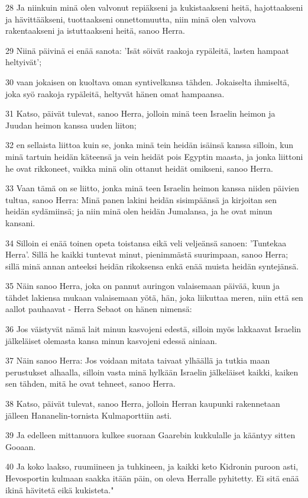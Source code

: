 \par 28 Ja niinkuin minä olen valvonut repiäkseni ja kukistaakseni heitä, hajottaakseni ja hävittääkseni, tuottaakseni onnettomuutta, niin minä olen valvova rakentaakseni ja istuttaakseni heitä, sanoo Herra.
\par 29 Niinä päivinä ei enää sanota: 'Isät söivät raakoja rypäleitä, lasten hampaat heltyivät';
\par 30 vaan jokaisen on kuoltava oman syntivelkansa tähden. Jokaiselta ihmiseltä, joka syö raakoja rypäleitä, heltyvät hänen omat hampaansa.
\par 31 Katso, päivät tulevat, sanoo Herra, jolloin minä teen Israelin heimon ja Juudan heimon kanssa uuden liiton;
\par 32 en sellaista liittoa kuin se, jonka minä tein heidän isäinsä kanssa silloin, kun minä tartuin heidän käteensä ja vein heidät pois Egyptin maasta, ja jonka liittoni he ovat rikkoneet, vaikka minä olin ottanut heidät omikseni, sanoo Herra.
\par 33 Vaan tämä on se liitto, jonka minä teen Israelin heimon kanssa niiden päivien tultua, sanoo Herra: Minä panen lakini heidän sisimpäänsä ja kirjoitan sen heidän sydämiinsä; ja niin minä olen heidän Jumalansa, ja he ovat minun kansani.
\par 34 Silloin ei enää toinen opeta toistansa eikä veli veljeänsä sanoen: 'Tuntekaa Herra'. Sillä he kaikki tuntevat minut, pienimmästä suurimpaan, sanoo Herra; sillä minä annan anteeksi heidän rikoksensa enkä enää muista heidän syntejänsä.
\par 35 Näin sanoo Herra, joka on pannut auringon valaisemaan päivää, kuun ja tähdet lakiensa mukaan valaisemaan yötä, hän, joka liikuttaa meren, niin että sen aallot pauhaavat - Herra Sebaot on hänen nimensä:
\par 36 Jos väistyvät nämä lait minun kasvojeni edestä, silloin myös lakkaavat Israelin jälkeläiset olemasta kansa minun kasvojeni edessä ainiaan.
\par 37 Näin sanoo Herra: Jos voidaan mitata taivaat ylhäällä ja tutkia maan perustukset alhaalla, silloin vasta minä hylkään Israelin jälkeläiset kaikki, kaiken sen tähden, mitä he ovat tehneet, sanoo Herra.
\par 38 Katso, päivät tulevat, sanoo Herra, jolloin Herran kaupunki rakennetaan jälleen Hananelin-tornista Kulmaporttiin asti.
\par 39 Ja edelleen mittanuora kulkee suoraan Gaarebin kukkulalle ja kääntyy sitten Gooaan.
\par 40 Ja koko laakso, ruumiineen ja tuhkineen, ja kaikki keto Kidronin puroon asti, Hevosportin kulmaan saakka itään päin, on oleva Herralle pyhitetty. Ei sitä enää ikinä hävitetä eikä kukisteta."

